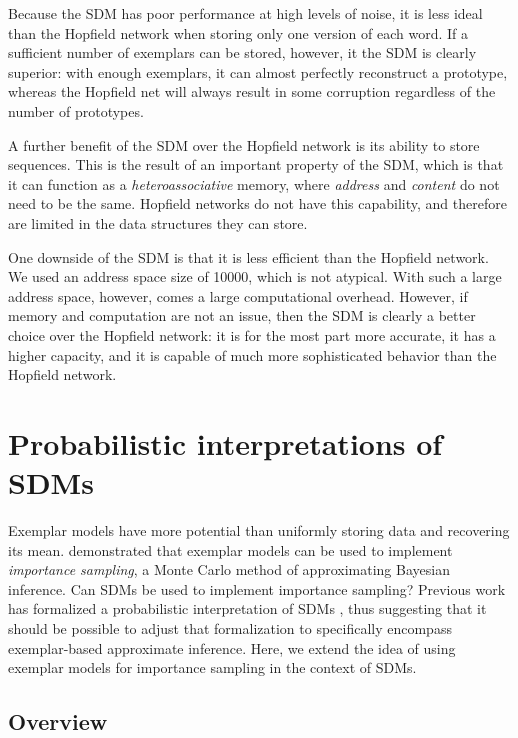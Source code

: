 \documentclass[10pt,letterpaper]{article}
\begin{document}
Because the SDM has poor performance at high levels of noise, it is
less ideal than the Hopfield network when storing only one version of
each word. If a sufficient number of exemplars can be stored, however,
it the SDM is clearly superior: with enough exemplars, it can almost
perfectly reconstruct a prototype, whereas the Hopfield net will
always result in some corruption regardless of the number of
prototypes.

A further benefit of the SDM over the Hopfield network is its ability
to store sequences. This is the result of an important property of the
SDM, which is that it can function as a \textit{heteroassociative}
memory, where \textit{address} and \textit{content} do not need to be
the same. Hopfield networks do not have this capability, and therefore
are limited in the data structures they can store.

One downside of the SDM is that it is less efficient than the Hopfield
network. We used an address space size of 10000, which is not
atypical. With such a large address space, however, comes a large
computational overhead. However, if memory and computation are not an
issue, then the SDM is clearly a better choice over the Hopfield
network: it is for the most part more accurate, it has a higher
capacity, and it is capable of much more sophisticated behavior than
the Hopfield network.


\section{Probabilistic interpretations of SDMs}

Exemplar models have more potential than uniformly storing data and
recovering its mean.  demonstrated that exemplar models
can be used to implement \textit{importance sampling}, a Monte Carlo
method of approximating Bayesian inference.  Can SDMs be used to
implement importance sampling? Previous work has formalized a
probabilistic interpretation of SDMs \cite{Anderson1989}, thus
suggesting that it should be possible to adjust that formalization to
specifically encompass exemplar-based approximate inference. Here, we
extend the idea of using exemplar models for importance sampling in
the context of SDMs.

\subsection{Overview}
\end{document}
